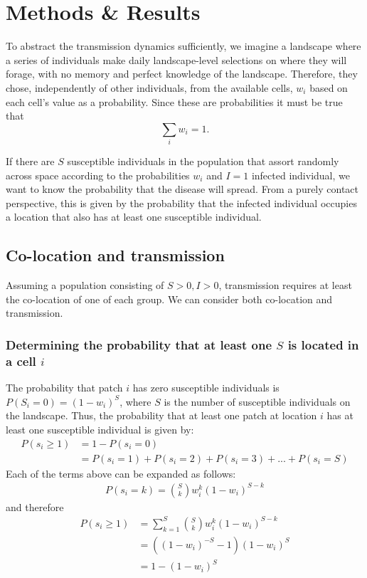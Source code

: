 \section*{Methods \& Results}\label{s:methods-results}

To abstract the transmission dynamics sufficiently, we imagine a landscape where a series of individuals make daily landscape-level selections on where they will forage, with no memory and perfect knowledge of the landscape. Therefore, they chose, independently of other individuals, from the available cells, $w_i$ based on each cell's value as a probability. Since these are probabilities it must be true that 
\begin{equation}
\sum_i w_{i}=1.
\end{equation}

If there are $S$ susceptible individuals in the population that assort randomly across space according to the probabilities $w_{i}$ and $I=1$ infected individual, we want to know the probability that the disease will spread. From a purely contact perspective, this is given by the probability that the infected individual occupies a location that also has at least one susceptible individual.

\subsection{Co-location and transmission}

Assuming a population consisting of $S>0, I>0$, transmission requires at least the co-location of one of each group. We can consider both co-location and transmission.

\subsubsection{Determining the probability that at least one $S$ is located in a cell $i$}

The probability that patch $i$ has zero susceptible individuals is $P(S_{i}=0)=(1-w_{i})^S$, where $S$ is the number of susceptible individuals on the landscape. Thus, the probability that at least one patch at location $i$ has at least one susceptible individual is given by:  
\begin{align}
P(s_{i} \geq 1) &=1-P(s_{i}=0) \\
&=P(s_{i}=1)+P(s_{i}=2)+P(s_{i}=3)+ ... +P(s_{i}=S)
\end{align}
Each of the terms above can be expanded as follows: 
\begin{align}
P(s_{i}=k)=\binom{S}{k}w_{i}^k(1-w_{i})^{S-k}
\end{align}
and therefore
\begin{align}
P(s_{i} \geq 1)&=\sum_{k=1}^{S}\binom{S}{k}w_{i}^k(1-w_{i})^{S-k}\\
&=\left((1-w_{i})^{-S}-1\right)(1-w_{i})^S\\
&=1-(1-w_{i})^S
\end{align}

